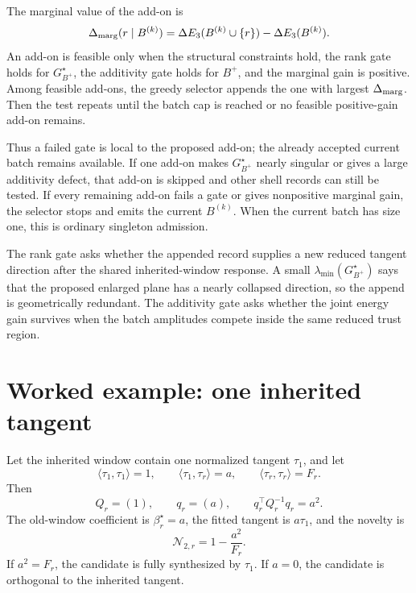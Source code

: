 \documentclass[10pt,twocolumn]{article}
\newcommand{\nov}{\mathcal N}
\begin{document}
The marginal value of the add-on is
\begin{equation}
\Delta_{\rm marg}(r\mid B^{(k)})
=
\Delta E_3(B^{(k)}\cup\{r\})-\Delta E_3(B^{(k)}).
\label{eq:p1_batch_marginal_gain}
\end{equation}
An add-on is feasible only when the structural constraints hold, the rank gate
holds for \(G_{B^+}^\star\), the additivity gate holds for \(B^+\), and the
marginal gain is positive.  Among feasible add-ons, the greedy selector appends
the one with largest \(\Delta_{\rm marg}\).  Then the test repeats until the
batch cap is reached or no feasible positive-gain add-on remains.

Thus a failed gate is local to the proposed add-on; the already accepted
current batch remains available.  If one add-on makes \(G_{B^+}^\star\) nearly
singular or gives a large additivity defect, that add-on is skipped and other
shell records can still be tested.  If every remaining add-on fails a gate or
gives nonpositive marginal gain, the selector stops and emits the current
\(B^{(k)}\).  When the current batch has size one, this is ordinary singleton
admission.

\begin{intuitionbox}
The rank gate asks whether the appended record supplies a new reduced tangent
direction after the shared inherited-window response.  A small
\(\lambda_{\min}(G_{B^+}^\star)\) says that the proposed enlarged plane has a
nearly collapsed direction, so the append is geometrically redundant.  The
additivity gate asks whether the joint energy gain survives when the batch
amplitudes compete inside the same reduced trust region.
\end{intuitionbox}

\appendix
\section{Worked example: one inherited tangent}

Let the inherited window contain one normalized tangent \(\tau_1\), and let
\begin{equation}
\langle\tau_1,\tau_1\rangle=1,\qquad
\langle\tau_1,\tau_r\rangle=a,\qquad
\langle\tau_r,\tau_r\rangle=F_r.
\end{equation}
Then
\begin{equation}
Q_r=(1),\qquad q_r=(a),\qquad
q_r^\top Q_r^{-1}q_r=a^2.
\end{equation}
The old-window coefficient is \(\beta_r^\star=a\), the fitted tangent is \(a\tau_1\), and the novelty is
\begin{equation}
\nov_{2,r}=1-\frac{a^2}{F_r}.
\end{equation}
If \(a^2=F_r\), the candidate is fully synthesized by \(\tau_1\). If \(a=0\), the candidate is orthogonal to the inherited tangent.
\end{document}
